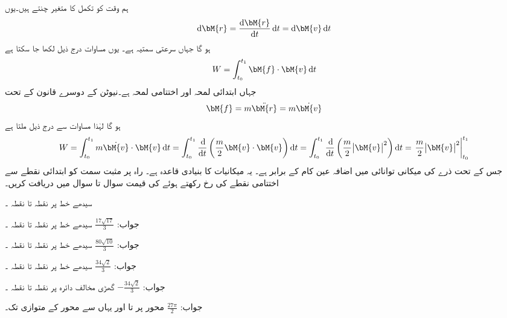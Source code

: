 ہم وقت  کو تکمل کا متغیر چنتے ہیں۔یوں
\begin{align*}
\dif \bM{r}=\frac{\dif\bM{r}}{\dif t}\dif t=\dif \bM{v}\dif t
\end{align*} 
ہو گا جہاں    سرعتی سمتیہ ہے۔ یوں مساوات  درج ذیل لکھا جا سکتا ہے
\begin{align}\label{مساوات_خطی_تکمل_کام_ب}
W=\int_{t_0}^{t_1}\bM{f}\cdot \bM{v}\dif t
\end{align}
جہاں ابتدائی لمحہ  اور اختتامی لمحہ  ہے۔نیوٹن کے دوسرے قانون کے تحت 
\begin{align}
\bM{f}=m\ddot{\bM{r}}=m\dot{\bM{v}}
\end{align}
ہو گا لہٰذا مساوات  سے درج ذیل ملتا ہے
\begin{align*}
W=\int_{t_0}^{t_1}m\dot{\bM{v}}\cdot \bM{v}\dif t=\int_{t_0}^{t_1}\frac{\dif}{\dif t}\left(\frac{m}{2}\bM{v}\cdot \bM{v}\right)\dif t=\int_{t_0}^{t_1}\frac{\dif}{\dif t}\left(\frac{m}{2}\abs{\bM{v}}^2\right)\dif t=\left.\frac{m}{2}\abs{\bM{v}}^2\right |_{t_0}^{t_1}
\end{align*}
جس  کے تحت ذرے کی میکانی توانائی میں اضافہ عین  کام کے برابر ہے۔ یہ میکانیات کا بنیادی قاعدہ ہے۔ 
راہ پر مثبت سمت کو ابتدائی نقطے سے اختتامی نقطے کی رخ رکھتے ہوئے  کی قیمت سوال  تا سوال  میں دریافت کریں۔

سیدھے خط  پر نقطہ  تا نقطہ ۔

جواب:\quad
$\tfrac{17\sqrt{17}}{3}$
سیدھے خط  پر نقطہ  تا نقطہ ۔

جواب:\quad
$\tfrac{80\sqrt{10}}{3}$
سیدھے خط  پر نقطہ  تا نقطہ ۔

جواب:\quad
$\tfrac{34\sqrt{2}}{3}$
سیدھے خط  پر نقطہ  تا نقطہ ۔

جواب:\quad
$-\tfrac{34\sqrt{2}}{3}$
گھڑی مخالف  دائرہ  پر نقطہ  تا نقطہ ۔

جواب:\quad
$\tfrac{27\pi}{2}$
محور  پر  تا  اور یہاں سے محور  کے متوازی  تک۔

